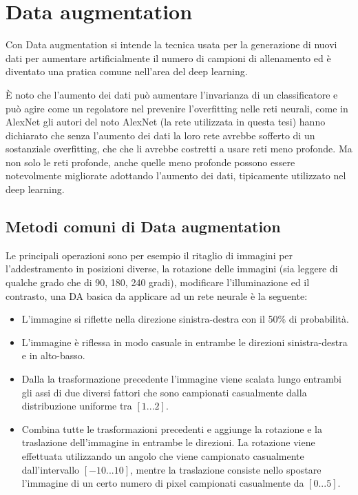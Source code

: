 \chapter{Data augmentation}\label{data-augmentation}

Con Data augmentation si intende la tecnica usata per la generazione di nuovi dati  per aumentare artificialmente il numero di campioni di allenamento ed è diventato una pratica comune nell'area del deep learning.

È noto che l'aumento dei dati può aumentare l'invarianza di un classificatore e può agire come un regolatore nel prevenire l'overfitting nelle reti neurali, come in AlexNet  gli autori del noto AlexNet (la rete utilizzata in questa tesi) hanno dichiarato che senza l'aumento dei dati la loro rete avrebbe sofferto di un sostanziale overfitting, che che li avrebbe costretti a usare reti meno profonde\cite{alexnet}. Ma non solo le reti profonde, anche quelle meno profonde  possono essere notevolmente migliorate adottando l'aumento dei dati, tipicamente utilizzato nel deep learning\cite{dataaugmentation}.


\section{Metodi comuni di Data augmentation}\label{metodi-comuni-di-data-augmentation}

Le principali operazioni sono per esempio  il ritaglio di immagini
per l'addestramento in posizioni diverse, la rotazione delle immagini (sia leggere di qualche grado che di 90, 180, 240 gradi), modificare l'illuminazione ed il contrasto, una DA basica da applicare ad un rete neurale è la seguente\cite{nanni_dtc_pca}:
\begin{itemize}
    \item L'immagine si riflette nella direzione sinistra-destra con il 50\% di probabilità. 
    \item L'immagine è riflessa in modo casuale in entrambe le direzioni sinistra-destra e in alto-basso.
    \item Dalla la trasformazione precedente l'immagine viene scalata lungo entrambi gli assi di due diversi fattori che sono
    campionati casualmente dalla distribuzione uniforme tra \([1...2]\).
    \item Combina tutte le trasformazioni precedenti  e aggiunge la rotazione e la traslazione dell'immagine in entrambe le
    direzioni. La rotazione viene effettuata utilizzando un angolo che viene campionato casualmente dall'intervallo
    \([-10...10]\), mentre la traslazione consiste nello spostare l'immagine di un certo numero di pixel
    campionati casualmente da \([0...5]\).
\end{itemize}

